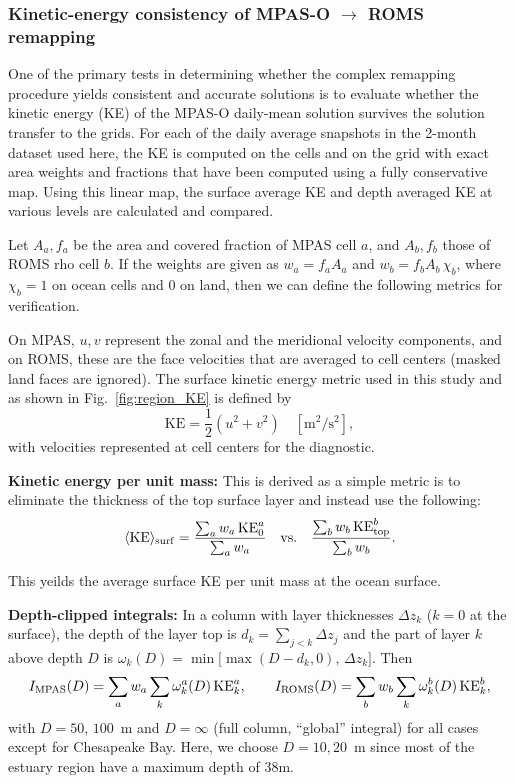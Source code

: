 \subsubsection{Kinetic-energy consistency of MPAS-O $\rightarrow$ ROMS remapping}

One of the primary tests in determining whether the complex remapping procedure yields consistent and accurate solutions is to evaluate whether the kinetic energy (KE) of the MPAS-O daily-mean solution survives the solution transfer to the \ROMS grids. For each of the daily average snapshots in the 2-month dataset used here, the KE is computed on the \MPAS cells and on the \ROMS grid with exact area weights and fractions that have been computed using a fully conservative map. Using this linear map, the surface average KE and depth averaged KE at various levels are calculated and compared.

Let $A_a,f_a$ be the area and covered fraction of MPAS cell $a$, and $A_b,f_b$ those of ROMS rho cell $b$. If the weights are given as $w_a=f_aA_a$ and $w_b=f_bA_b\,\chi_b$, where $\chi_b=1$ on ocean cells and $0$ on land, then we can define the following metrics for verification.


On MPAS, $u,v$ represent the zonal and the meridional velocity components,  and on ROMS, these are the face velocities that are averaged to cell centers (masked land faces are ignored). The surface kinetic energy metric used in this study and as shown in Fig.~\ref{fig:region_KE} is defined by
\begin{equation}
	\mathrm{KE}=\frac{1}{2}\left(u^2+v^2\right)\quad [\si{\metre\squared\per\second\squared}],
	\label{conv:eq:ke}
\end{equation}
with velocities represented at cell centers for the diagnostic.

\textbf{Kinetic energy per unit mass:} 
%
This is derived as a simple metric is to eliminate the thickness of the top surface layer and instead use the following:
\begin{equation}
	\langle \mathrm{KE}\rangle_{\rm surf}=\frac{\sum_a w_a\,\mathrm{KE}^a_{0}}{\sum_a w_a}\quad\text{vs.}\quad \frac{\sum_b w_b\,\mathrm{KE}^b_{\rm top}}{\sum_b w_b}.
\end{equation}

This yeilds the average surface KE per unit mass at the ocean surface. 

\textbf{Depth-clipped integrals:}
%
In a column with layer thicknesses $\Delta z_k$ ($k=0$ at the surface), the depth of the layer top is $d_k=\sum_{j<k}\Delta z_j$ and the part of layer $k$ above depth $D$ is $\omega_k(D)=\min\!\big[\max(D-d_k,0),\,\Delta z_k\big]$. Then
\begin{equation}
I_{\rm MPAS}(D)=\sum_a w_a\sum_k\omega^{a}_k(D)\,\mathrm{KE}^{a}_k,\qquad
I_{\rm ROMS}(D)=\sum_b w_b\sum_k\omega^{b}_k(D)\,\mathrm{KE}^{b}_k ,
\end{equation}
with $D=50$, $100$~m and $D=\infty$ (full column, ``global'' integral) for all cases except for Chesapeake Bay. Here, we choose $D=10,20$~m since most of the estuary region have a  maximum depth of 38m. 


